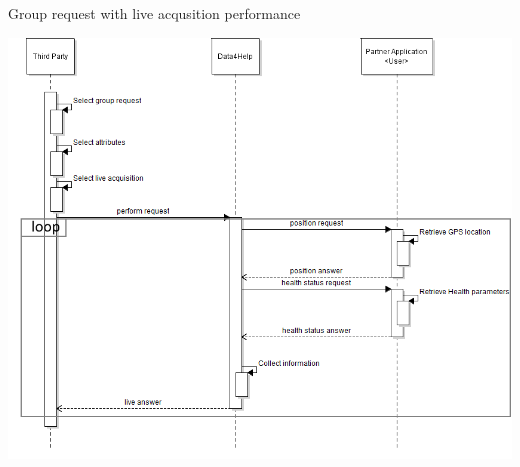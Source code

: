 \begin{enumerate}
\begin{minipage}{\textwidth}
\end{minipage}

\begin{minipage}{\textwidth}
\FloatBarrier
Group request with live acqusition performance
\begin{center}
\includegraphics[scale=0.75]{Images/Seq_Data4Help_live.png}
\end{center}
\FloatBarrier
\end{minipage}







\end{enumerate}



